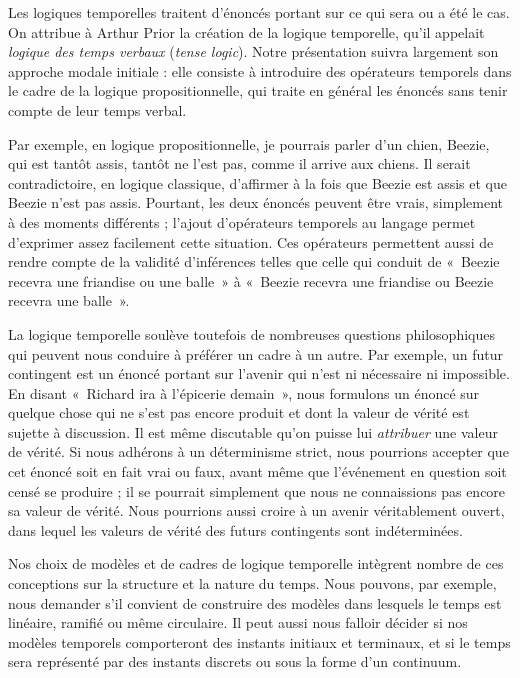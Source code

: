 \documentclass[../../../include/open-logic-section]{subfiles}
\begin{document}


Les logiques temporelles traitent d'énoncés portant sur ce qui sera ou
a été le cas. On attribue à Arthur Prior la création de la logique
temporelle, qu'il appelait \emph{logique des temps verbaux}
(\emph{tense logic}). Notre présentation suivra largement son
approche modale initiale : elle consiste à introduire des opérateurs
temporels dans le cadre de la logique propositionnelle, qui traite en
général les énoncés sans tenir compte de leur temps verbal.

Par exemple, en logique propositionnelle, je pourrais parler d'un
chien, Beezie, qui est tantôt assis, tantôt ne l'est pas, comme il
arrive aux chiens. Il serait contradictoire, en logique classique,
d'affirmer à la fois que Beezie est assis et que Beezie n'est pas
assis. Pourtant, les deux énoncés peuvent être vrais, simplement à
des moments différents ; l'ajout d'opérateurs temporels au langage
permet d'exprimer assez facilement cette situation. Ces opérateurs
permettent aussi de rendre compte de la validité d'inférences telles
que celle qui conduit de «~Beezie recevra une friandise ou une balle~»
à «~Beezie recevra une friandise ou Beezie recevra une balle~».

La logique temporelle soulève toutefois de nombreuses questions
philosophiques qui peuvent nous conduire à préférer un cadre à un
autre. Par exemple, un futur contingent est un énoncé portant sur
l'avenir qui n'est ni nécessaire ni impossible. En disant
«~Richard ira à l'épicerie demain~», nous formulons un énoncé sur
quelque chose qui ne s'est pas encore produit et dont la valeur de
vérité est sujette à discussion. Il est même discutable qu'on puisse
lui \emph{attribuer} une valeur de vérité. Si nous adhérons à un
déterminisme strict, nous pourrions accepter que cet énoncé soit en
fait vrai ou faux, avant même que l'événement en question soit censé
se produire ; il se pourrait simplement que nous ne connaissions
pas encore sa valeur de vérité. Nous pourrions aussi croire à un
avenir véritablement ouvert, dans lequel les valeurs de vérité des
futurs contingents sont indéterminées.

Nos choix de modèles et de cadres de logique temporelle intègrent
nombre de ces conceptions sur la structure et la nature du temps.
Nous pouvons, par exemple, nous demander s'il convient de construire
des modèles dans lesquels le temps est linéaire, ramifié ou même
circulaire. Il peut aussi nous falloir décider si nos modèles
temporels comporteront des instants initiaux et terminaux, et si le
temps sera représenté par des instants discrets ou sous la forme
d'un continuum.
\end{document}
